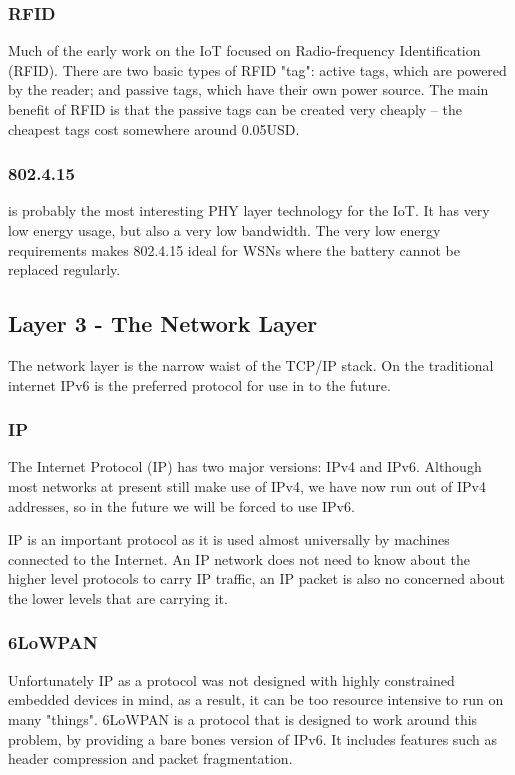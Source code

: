\documentclass[journal]{IEEEtran}
\begin{document}
\subsubsection{RFID}
Much of the early work on the IoT focused on Radio-frequency Identification
(RFID). There are two basic types of RFID "tag": active tags, which are powered
by the reader; and passive tags, which have their own power source. The main
benefit of RFID is that the passive tags can be created very cheaply -- the
cheapest tags cost somewhere around 0.05USD. 

\subsubsection{802.4.15}
is probably the most interesting PHY layer technology for the IoT. It has very
low energy usage, but also a very low bandwidth. The very low energy
requirements makes 802.4.15 ideal for WSNs where the battery cannot be replaced
regularly. 


\subsection{Layer 3 - The Network Layer}
The network layer is the narrow waist of the TCP/IP stack. On the traditional
internet IPv6 is the preferred protocol for use in to the future.

\subsubsection{IP}
The Internet Protocol (IP) has two major versions: IPv4 and IPv6. Although most
networks at present still make use of IPv4, we have now run out of IPv4
addresses, so in the future we will be forced to use IPv6.

IP is an important protocol as it is used almost universally by machines
connected to the Internet. An IP network does not need to know about the higher
level protocols to carry IP traffic, an IP packet is also no concerned about
the lower levels that are carrying it. 

\subsubsection{6LoWPAN}
Unfortunately IP as a protocol was not designed with highly constrained
embedded devices in mind, as a result, it can be too resource intensive to run
on many "things". 6LoWPAN is a protocol that is designed to work around this
problem, by providing a bare bones version of IPv6. It includes features such
as header compression and packet fragmentation.  
\end{document}
